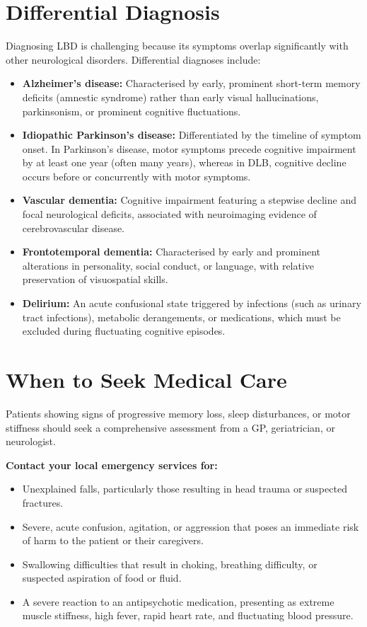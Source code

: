 \section*{Differential Diagnosis}
Diagnosing LBD is challenging because its symptoms overlap significantly with other neurological disorders. Differential diagnoses include:

\begin{itemize}
    \item \textbf{Alzheimer's disease:} Characterised by early, prominent short-term memory deficits (amnestic syndrome) rather than early visual hallucinations, parkinsonism, or prominent cognitive fluctuations.
    \item \textbf{Idiopathic Parkinson's disease:} Differentiated by the timeline of symptom onset. In Parkinson's disease, motor symptoms precede cognitive impairment by at least one year (often many years), whereas in DLB, cognitive decline occurs before or concurrently with motor symptoms.
    \item \textbf{Vascular dementia:} Cognitive impairment featuring a stepwise decline and focal neurological deficits, associated with neuroimaging evidence of cerebrovascular disease.
    \item \textbf{Frontotemporal dementia:} Characterised by early and prominent alterations in personality, social conduct, or language, with relative preservation of visuospatial skills.
    \item \textbf{Delirium:} An acute confusional state triggered by infections (such as urinary tract infections), metabolic derangements, or medications, which must be excluded during fluctuating cognitive episodes.
\end{itemize}

\section*{When to Seek Medical Care}
Patients showing signs of progressive memory loss, sleep disturbances, or motor stiffness should seek a comprehensive assessment from a GP, geriatrician, or neurologist.

\textbf{Contact your local emergency services for:}
\begin{itemize}
    \item Unexplained falls, particularly those resulting in head trauma or suspected fractures.
    \item Severe, acute confusion, agitation, or aggression that poses an immediate risk of harm to the patient or their caregivers.
    \item Swallowing difficulties that result in choking, breathing difficulty, or suspected aspiration of food or fluid.
    \item A severe reaction to an antipsychotic medication, presenting as extreme muscle stiffness, high fever, rapid heart rate, and fluctuating blood pressure.
\end{itemize}

